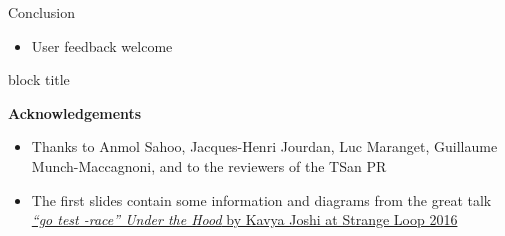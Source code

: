 \begin{frame}[fragile]{Conclusion}
\begin{itemize}
    \item User feedback welcome
  \end{itemize}
  \vspace{5pt}
  \begin{beamercolorbox}[wd=\paperwidth, ht=11ex, dp=2ex, leftskip=2ex, rightskip=2ex]{block title}%
    \hspace{-0.5em}%
    \begin{minipage}[b]{0.95\paperwidth}%
    \footnotesize\normalfont%
    \textbf{Acknowledgements}
    \begin{itemize}[noitemsep]
      \item Thanks to Anmol Sahoo, Jacques-Henri Jourdan, Luc Maranget, Guillaume Munch-Maccagnoni, and to the reviewers of the TSan PR
      \item The first slides contain some information and diagrams from the great talk \href{https://www.youtube.com/watch?v=5erqWdlhQLA}{\emph{``go test -race'' Under the Hood} by Kavya Joshi at Strange Loop 2016}
    \end{itemize}
  \end{minipage}
  \end{beamercolorbox}%
\end{frame}

